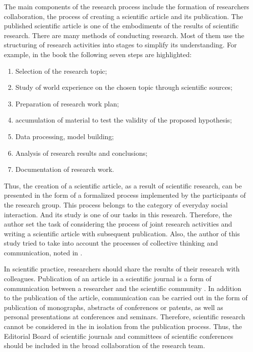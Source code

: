 \documentclass[12pt]{report}
\theoremstyle{definition}
\providecommand{\tightlist}{%
	\setlength{\itemsep}{0pt}\setlength{\parskip}{0pt}}
\begin{document}
The main components of the research process include the formation of researchers collaboration, the process of creating a scientific article and its publication. 
The published scientific article is one of the embodiments of the results of scientific research. 
There are many methods of conducting research. 
Most of them use the structuring of research activities into stages to simplify its understanding. 
For example, in the book \cite{lipch2013met} the following seven steps are highlighted:

\begin{enumerate}
	\tightlist
	\item Selection of the research topic;
	\item Study of world experience on the chosen topic through scientific sources;
	\item Preparation of research work plan;
	\item accumulation of material to test the validity of the proposed hypothesis;
	\item Data processing, model building;
	\item Analysis of research results and conclusions;
	\item Documentation of research work.
\end{enumerate}

Thus, the creation of a scientific article, as a result of scientific research, can be presented in the form of a formalized process implemented by the participants of the research group. 
This process belongs to the category of everyday social interaction. 
And its study is one of our tasks in this research. 
Therefore, the author set the task of considering the process of joint research activities and writing a scientific article with subsequent publication. 
Also, the author of this study tried to take into account the processes of collective thinking and communication, noted in \cite{mkrt1995f}.

In scientific practice, researchers should share the results of their research with colleagues. 
Publication of an article in a scientific journal is a form of communication between a researcher and the scientific community \cite{danil2016o}. 
In addition to the publication of the article, communication can be carried out in the form of publication of monographs, abstracts of conferences or patents, as well as personal presentations at conferences and seminars. 
Therefore, scientific research cannot be considered in the in isolation from the publication process.
Thus, the Editorial Board of scientific journals and committees of scientific conferences should be included in the broad collaboration of the research team.
\end{document}
